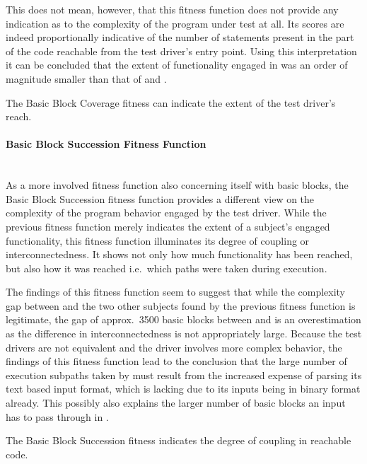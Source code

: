 This does not mean, however, that this fitness function does not provide any indication as to the complexity of
the program under test at all. Its scores are indeed proportionally indicative of the number of statements
present in the part of the code reachable from the test driver's entry point. Using this interpretation it can
be concluded that the extent of functionality engaged in \libpcap was an order of magnitude smaller than that
of \libpng and \libxml.

\begin{mdframed}
\centering
The Basic Block Coverage fitness can indicate the extent of the test driver's reach. 
\end{mdframed}

\paragraph{Basic Block Succession Fitness Function} ~\\
As a more involved fitness function also concerning itself with basic blocks, the Basic Block Succession
fitness function provides a different view on the complexity of the program behavior engaged by the test
driver.
While the previous fitness function merely indicates the extent of a subject's engaged functionality, this
fitness function illuminates its degree of coupling or interconnectedness. It shows not only how much
functionality has been reached, but also how it was reached i.e.\ which paths were taken during execution.

The findings of this fitness function seem to suggest that while the complexity gap between \libpcap and the
two other subjects found by the previous fitness function is legitimate, the gap of approx.\ 3500 basic blocks
between \libpng and \libxml is an overestimation as the difference in interconnectedness is not appropriately
large. Because the test drivers are not equivalent and the \libpng driver involves more complex
behavior, the findings of this fitness function lead to the conclusion that the large number of execution
subpaths taken by \libxml must result from the increased expense of parsing its text based input format, which
\libpng is lacking due to its inputs being in binary format already. This possibly also explains the larger
number of basic blocks an input has to pass through in \libxml.

\begin{mdframed}
\centering
The Basic Block Succession fitness indicates the degree of coupling in reachable code.
\end{mdframed}

